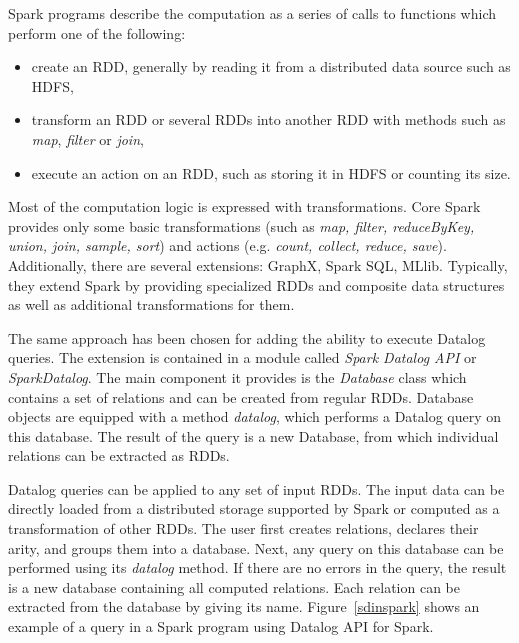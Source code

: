 Spark programs describe the computation as a series of calls to functions which perform one of the following:
\begin{itemize}
  \item create an RDD, generally by reading it from a distributed data source such as HDFS,
  \item transform an RDD or several RDDs into another RDD with methods such as \emph{map}, \emph{filter} or \emph{join},
  \item execute an action on an RDD, such as storing it in HDFS or counting its size.
\end{itemize}

Most of the computation logic is expressed with transformations.  Core Spark provides only some basic transformations (such as \emph{map, filter, reduceByKey, union, join, sample, sort}) and actions (e.g. \emph{count, collect, reduce, save}). Additionally, there are several extensions: GraphX, Spark SQL, MLlib. Typically, they extend Spark by providing specialized RDDs and composite data structures as well as additional transformations for them.

The same approach has been chosen for adding the ability to execute Datalog queries. The extension is contained in a module called \emph{Spark Datalog API} or \emph{SparkDatalog}. The main component it provides is the \emph{Database} class which contains a set of relations and can be created from regular RDDs. Database objects are equipped with a method \emph{datalog}, which performs a Datalog query on this database. The result of the query is a new Database, from which individual relations can be extracted as RDDs. 

Datalog queries can be applied to any set of input RDDs. The input data can be directly loaded from a distributed storage supported by Spark or computed as a transformation of other RDDs. The user first creates relations, declares their arity, and groups them into a database. Next, any query on this database can be performed using its \emph{datalog} method. If there are no errors in the query, the result is a new database containing all computed relations. Each relation can be extracted from the database by giving its name. Figure~\ref{sdinspark} shows an example of a \datalogra query in a Spark program using Datalog API for Spark.

